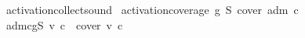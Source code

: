\begin{isabelle}
\ activation\isacharunderscore{}collect\isacharunderscore{}sound\isacharcolon{}\isanewline
\isaindent{\ \ }\ \isachardoublequote{}activation\isacharunderscore{}coverage\ g\ S\ cover\ adm\ c\ {\isasymG}\isachardoublequote{}\isanewline
\isaindent{\ \ }\ \isachardoublequote{}{\isasymA}\isactrlbsub {\isasymG}\isacharcomma{}adm\isacharcomma{}c\isacharcomma{}g\isacharcomma{}S\isactrlesub{}\ v\ c\ {\isasymsubseteq}\ cover\ v\ c\isachardoublequote{}
\end{isabelle}
